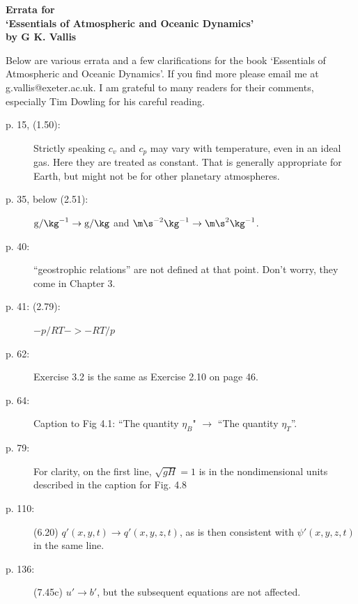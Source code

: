 \documentclass[12pt]{article}
\newcommand{\gt}{\text{g}}
\begin{document}
\begin{center}
\large \bfseries \sffamily
Errata for \\ `Essentials of Atmospheric and Oceanic Dynamics' \\ by G K. Vallis
\end{center}
\vspace{1cm}


\noindent Below are various errata and a few clarifications for the book `Essentials of Atmospheric and Oceanic Dynamics'. If you find more please email me at g.vallis@exeter.ac.uk.   I am grateful to many readers for their comments, especially Tim Dowling for his careful reading.  

\begin{description}

\item [p. 15,  (1.50):]   
Strictly speaking $c_v$ and $c_p$ may vary with temperature, even in an ideal gas. Here they are treated as constant. That is generally appropriate for Earth, but might not be for other planetary atmospheres. 

\item [p. 35, below (2.51):] $\gt/\kg^{-1}  \to  \gt/\kg$  and $\m \s^{-2} \kg^{-1} \to  \m\s^2 \kg^{-1} $.

\item [p. 40:] “geostrophic relations” are not defined at that point. Don't worry, they come in Chapter 3. 

\item [p. 41: (2.79):]  $-p/RT -> -RT/p$

\item [p. 62:] Exercise 3.2 is the same as Exercise 2.10 on page 46. 

\item [p. 64:]  Caption to Fig 4.1: “The quantity $\eta_B$"  $\to$  “The quantity $\eta_T$”. 

\item [p. 79:] For clarity, on the first line, $\sqrt{gH} = 1$  is in the nondimensional units described in the caption for Fig. 4.8 

\item [p. 110:]  (6.20) $q'(x,y,t) \to q'(x,y,z,t)$,  as is then consistent with $\psi'(x,y,z,t)$ in the same line.

\item [p. 136:]   (7.45c) $u'\to b'$, but the subsequent equations are not affected. 


\end{description}

 
 
\end{document}
